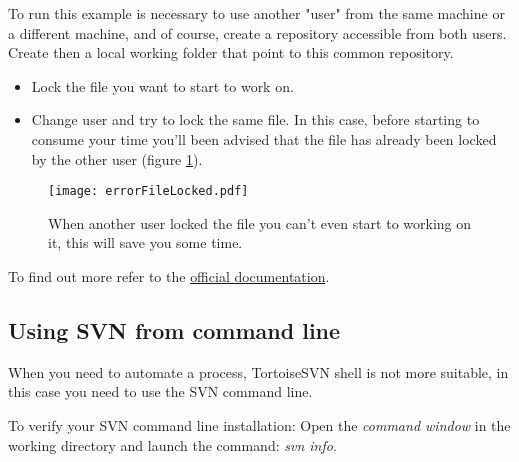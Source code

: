 To run this example is necessary to use another "user" from the same machine or a different machine, and of course, create a repository accessible from both users. Create then a local working folder that point to this common repository.\\

\begin{itemize}

    \item Lock the file you want to start to work on.
    
    \item Change user and try to lock the same file. In this case, before starting to consume your time you'll been advised that the file has already been locked by the other user (figure \ref{fig:errorFileLocked}).

\end{itemize}




\begin{figure}[htbp]
    \centering
    \texttt{[image: errorFileLocked.pdf]}
    \caption{When another user locked the file you can't even start to working on it, this will save you some time.}
    \label{fig:errorFileLocked}
\end{figure}





To find out more refer to the \href{https://tortoisesvn.net/docs/release/TortoiseSVN_en/tsvn-dug-locking.html}{official documentation}.








\subsection{Using SVN from command line}
\label{subsection:SVNCommandLine}

When you need to automate a process, TortoiseSVN shell is not more suitable, 
in this case you need to use the SVN command line.\newline


To verify your SVN command line installation: Open the \textit{command window} in the working directory and launch the command: \textit{svn info}.



